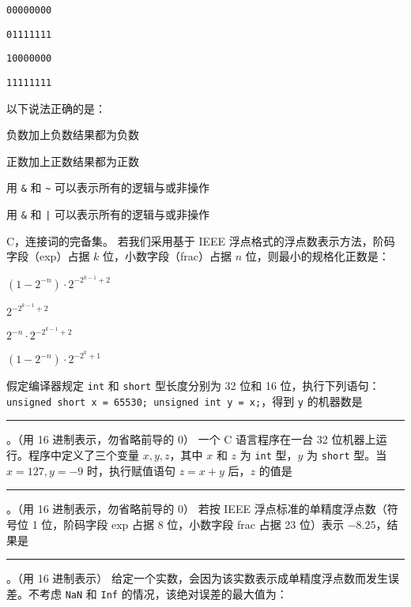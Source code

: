 \begin{problems}
		\begin{figure}[H]
			\centering
		\end{figure}
		\begin{choices}
			\item \texttt{00000000}
			\item \texttt{01111111}
			\item \texttt{10000000}
			\item \texttt{11111111}
		\end{choices}
		 以下说法正确的是：
		\begin{choices}
			\item 负数加上负数结果都为负数
			\item 正数加上正数结果都为正数
			\item 用 \verb|&| 和 \verb|~| 可以表示所有的逻辑与或非操作
			\item 用 \verb|&| 和 \verb+|+ 可以表示所有的逻辑与或非操作
		\end{choices}
		\sol C，连接词的完备集。
		 若我们采用基于 IEEE 浮点格式的浮点数表示方法，阶码字段（exp）占据 $k$ 位，小数字段（frac）占据 $n$ 位，则最小的规格化正数是：
		\begin{choices}
			\item $(1-2^{-n}) \cdot 2^{-2^{k-1}+2}$
			\item $2^{-2^{k-1}+2}$
			\item $2^{-n} \cdot 2^{-2^{k-1}+2}$
			\item $(1-2^{-n}) \cdot 2^{-2^k+1}$
		\end{choices}
		 假定编译器规定 \texttt{int} 和 \texttt{short} 型长度分别为 32 位和 16 位，执行下列语句：\texttt{unsigned short x = 65530; unsigned int y = x;}，得到 \texttt{y} 的机器数是 \rule{2.5cm}{0.25mm}。（用 16 进制表示，勿省略前导的 0）
		 一个 C 语言程序在一台 32 位机器上运行。程序中定义了三个变量 $x, y, z$，其中 $x$ 和 $z$ 为 \texttt{int} 型，$y$ 为 \texttt{short} 型。当 $x=127, y=-9$ 时，执行赋值语句 $z=x+y$ 后，$z$ 的值是 \rule{2.5cm}{0.25mm}。（用 16 进制表示，勿省略前导的 0）
		 若按 IEEE 浮点标准的单精度浮点数（符号位 1 位，阶码字段 exp 占据 8 位，小数字段 frac 占据 23 位）表示 $-8.25$，结果是 \rule{2.5cm}{0.25mm}。（用 16 进制表示）
		 给定一个实数，会因为该实数表示成单精度浮点数而发生误差。不考虑 \texttt{NaN} 和 \texttt{Inf} 的情况，该绝对误差的最大值为：

\end{problems}
